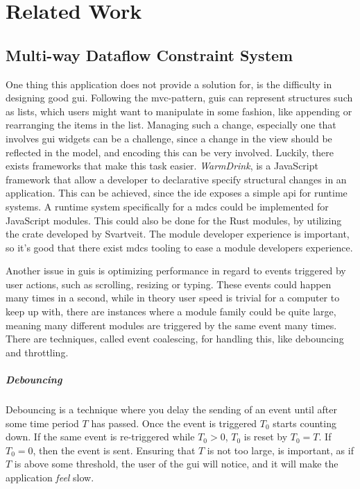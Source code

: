 \chapter{Related Work} \label{cha:related}

\section{Multi-way Dataflow Constraint System} \label{sec:mdcs}

One thing this application does not provide a solution for, is the difficulty
in designing good \gls{gui}. Following the \gls{mvc}-pattern, \gls{gui}s can
represent structures such as lists, which users might want to manipulate in
some fashion, like appending or rearranging the items in the list. Managing such
a change, especially one that involves \gls{gui} widgets can be a challenge,
since a change in the view should be reflected in the model, and encoding this
can be very involved. Luckily, there exists frameworks that make this task
easier. \textit{WarmDrink}, \cite{warmDrink} \cite{dslMdcs} is a JavaScript
framework that allow a developer to declarative specify structural changes in
an application. This can be achieved, since the \gls{ide} exposes a simple
\gls{api} for runtime systems. A runtime system specifically for a \gls{mdcs}
could be implemented for JavaScript modules. This could also be done for the
Rust modules, by utilizing the crate developed by Svartveit. \cite{mcdsRust}
The module developer experience is important, so it's good that there exist
\gls{mdcs} tooling to ease a module developers experience. \cite{toolMcds}

Another issue in \gls{gui}s is optimizing performance in regard to events
triggered by user actions, such as scrolling, resizing or typing. These events
could happen many times in a second, while in theory user speed is trivial for a
computer to keep up with, there are instances where a module family could be
quite large, meaning many different modules are triggered by the same event many
times. There are techniques, called event coalescing, for handling this, like
debouncing and throttling.

\paragraph{Debouncing} Debouncing is a technique where you delay the sending of
an event until after some time period $T$ has passed. Once the event is triggered
$T_0$ starts counting down. If the same event is re-triggered while $T_0 > 0$,
$T_0$ is reset by $T_0 = T$. If $T_0 = 0$, then the event is sent. Ensuring that
$T$ is not too large, is important, as if $T$ is above some threshold, the user
of the \gls{gui} will notice, and it will make the application \textit{feel}
slow.


